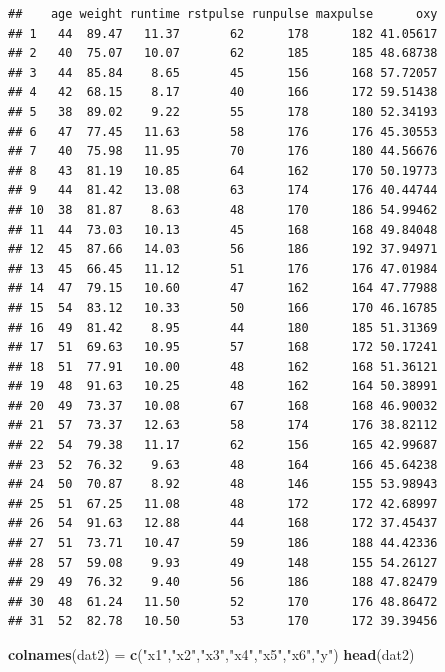 \documentclass[
]{article}
\newenvironment{Shaded}{\begin{snugshade}}{\end{snugshade}}
\newcommand{\FunctionTok}[1]{\textcolor[rgb]{0.13,0.29,0.53}{\textbf{#1}}}
\newcommand{\NormalTok}[1]{#1}
\newcommand{\OtherTok}[1]{\textcolor[rgb]{0.56,0.35,0.01}{#1}}
\newcommand{\StringTok}[1]{\textcolor[rgb]{0.31,0.60,0.02}{#1}}
\begin{document}
\begin{verbatim}
##    age weight runtime rstpulse runpulse maxpulse      oxy
## 1   44  89.47   11.37       62      178      182 41.05617
## 2   40  75.07   10.07       62      185      185 48.68738
## 3   44  85.84    8.65       45      156      168 57.72057
## 4   42  68.15    8.17       40      166      172 59.51438
## 5   38  89.02    9.22       55      178      180 52.34193
## 6   47  77.45   11.63       58      176      176 45.30553
## 7   40  75.98   11.95       70      176      180 44.56676
## 8   43  81.19   10.85       64      162      170 50.19773
## 9   44  81.42   13.08       63      174      176 40.44744
## 10  38  81.87    8.63       48      170      186 54.99462
## 11  44  73.03   10.13       45      168      168 49.84048
## 12  45  87.66   14.03       56      186      192 37.94971
## 13  45  66.45   11.12       51      176      176 47.01984
## 14  47  79.15   10.60       47      162      164 47.77988
## 15  54  83.12   10.33       50      166      170 46.16785
## 16  49  81.42    8.95       44      180      185 51.31369
## 17  51  69.63   10.95       57      168      172 50.17241
## 18  51  77.91   10.00       48      162      168 51.36121
## 19  48  91.63   10.25       48      162      164 50.38991
## 20  49  73.37   10.08       67      168      168 46.90032
## 21  57  73.37   12.63       58      174      176 38.82112
## 22  54  79.38   11.17       62      156      165 42.99687
## 23  52  76.32    9.63       48      164      166 45.64238
## 24  50  70.87    8.92       48      146      155 53.98943
## 25  51  67.25   11.08       48      172      172 42.68997
## 26  54  91.63   12.88       44      168      172 37.45437
## 27  51  73.71   10.47       59      186      188 44.42336
## 28  57  59.08    9.93       49      148      155 54.26127
## 29  49  76.32    9.40       56      186      188 47.82479
## 30  48  61.24   11.50       52      170      176 48.86472
## 31  52  82.78   10.50       53      170      172 39.39456
\end{verbatim}

\begin{Shaded}
\begin{Highlighting}[]
\FunctionTok{colnames}\NormalTok{(dat2) }\OtherTok{=} \FunctionTok{c}\NormalTok{(}\StringTok{"x1"}\NormalTok{,}\StringTok{"x2"}\NormalTok{,}\StringTok{"x3"}\NormalTok{,}\StringTok{"x4"}\NormalTok{,}\StringTok{"x5"}\NormalTok{,}\StringTok{"x6"}\NormalTok{,}\StringTok{"y"}\NormalTok{)}
\FunctionTok{head}\NormalTok{(dat2)}
\end{Highlighting}
\end{Shaded}
\end{document}
